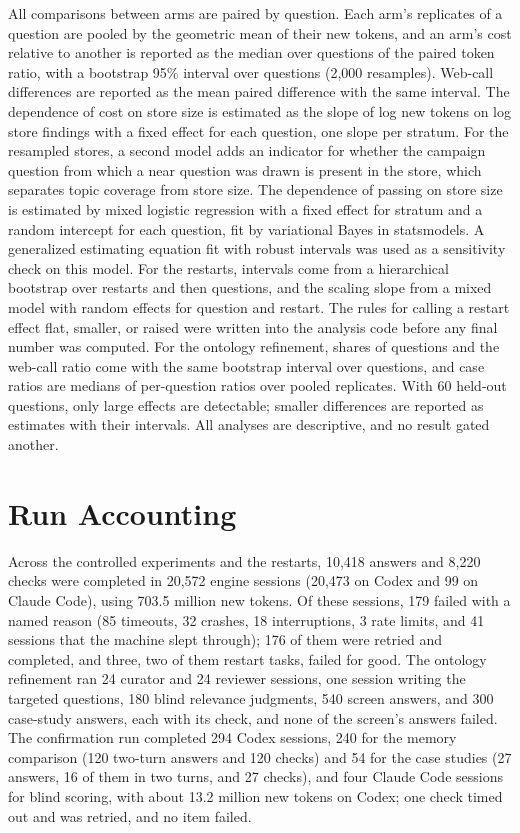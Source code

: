 \documentclass[journal=mamobx,manuscript=suppinfo]{achemso}
\begin{document}
All comparisons between arms are paired by question.
Each arm's replicates of a question are pooled by the geometric mean of their new tokens, and an arm's cost relative to another is reported as the median over questions of the paired token ratio, with a bootstrap 95\% interval over questions (2,000 resamples).
Web-call differences are reported as the mean paired difference with the same interval.
The dependence of cost on store size is estimated as the slope of log new tokens on log store findings with a fixed effect for each question, one slope per stratum.
For the resampled stores, a second model adds an indicator for whether the campaign question from which a near question was drawn is present in the store, which separates topic coverage from store size.
The dependence of passing on store size is estimated by mixed logistic regression with a fixed effect for stratum and a random intercept for each question, fit by variational Bayes in statsmodels.\cite{Seabold2010Statsmodels}
A generalized estimating equation fit with robust intervals was used as a sensitivity check on this model.
For the restarts, intervals come from a hierarchical bootstrap over restarts and then questions, and the scaling slope from a mixed model with random effects for question and restart.
The rules for calling a restart effect flat, smaller, or raised were written into the analysis code before any final number was computed.
For the ontology refinement, shares of questions and the web-call ratio come with the same bootstrap interval over questions, and case ratios are medians of per-question ratios over pooled replicates.
With 60 held-out questions, only large effects are detectable; smaller differences are reported as estimates with their intervals.
All analyses are descriptive, and no result gated another.

\section{Run Accounting}
\label{si:accounting}

Across the controlled experiments and the restarts, 10,418 answers and 8,220 checks were completed in 20,572 engine sessions (20,473 on Codex and 99 on Claude Code), using 703.5 million new tokens.
Of these sessions, 179 failed with a named reason (85 timeouts, 32 crashes, 18 interruptions, 3 rate limits, and 41 sessions that the machine slept through); 176 of them were retried and completed, and three, two of them restart tasks, failed for good.
The ontology refinement ran 24 curator and 24 reviewer sessions, one session writing the targeted questions, 180 blind relevance judgments, 540 screen answers, and 300 case-study answers, each with its check, and none of the screen's answers failed.
The confirmation run completed 294 Codex sessions, 240 for the memory comparison (120 two-turn answers and 120 checks) and 54 for the case studies (27 answers, 16 of them in two turns, and 27 checks), and four Claude Code sessions for blind scoring, with about 13.2 million new tokens on Codex; one check timed out and was retried, and no item failed.
\end{document}
